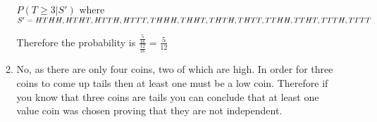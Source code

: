 \documentclass{article}
\begin{document}
\begin{enumerate}
\begin{enumerate}
                                $P(T\geq3|S')$ where $S'=\\{HTHH,HTHT,HTTH,HTTT,THHH,\\THHT,THTH,THTT,TTHH,TTHT,TTTH,TTTT\\}$

                                Therefore the probability is $\frac{\frac{5}{16}}{\frac{12}{16}}=\frac{5}{12}$
                        \item No, as there are only four coins, two of which are high. In order for three coins to come up tails then at least one must be a low coin. Therefore if you know that three coins are tails you can conclude that at least one value coin was chosen proving that they are not independent.
                \end{enumerate}
\end{enumerate}
\end{document}
